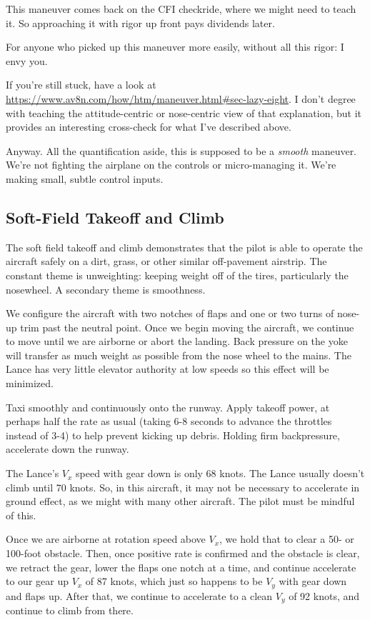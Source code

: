 This maneuver comes back on the CFI checkride, where we might need to teach it. So approaching it with rigor up front pays dividends later.

For anyone who picked up this maneuver more easily, without all this rigor: I envy you.

If you're still stuck, have a look at \url{https://www.av8n.com/how/htm/maneuver.html#sec-lazy-eight}. I don't degree with teaching the attitude-centric or nose-centric view of that explanation, but it provides an interesting cross-check for what I've described above.

Anyway. All the quantification aside, this is supposed to be a \emph{smooth} maneuver. We're not fighting the airplane on the controls or micro-managing it. We're making small, subtle control inputs.

\subsection{Soft-Field Takeoff and Climb}

The soft field takeoff and climb demonstrates that the pilot is able to operate the aircraft safely on a dirt, grass, or other similar off-pavement airstrip. The constant theme is unweighting: keeping weight off of the tires, particularly the nosewheel. A secondary theme is smoothness.

We configure the aircraft with two notches of flaps and one or two turns of nose-up trim past the neutral point. Once we begin moving the aircraft, we continue to move until we are airborne or abort the landing. Back pressure on the yoke will transfer as much weight as possible from the nose wheel to the mains. The Lance has very little elevator authority at low speeds so this effect will be minimized.

Taxi smoothly and continuously onto the runway. Apply takeoff power, at perhaps half the rate as usual (taking 6-8 seconds to advance the throttles instead of 3-4) to help prevent kicking up debris. Holding firm backpressure, accelerate down the runway.

The Lance's $V_x$ speed with gear down is only 68 knots. The Lance usually doesn't climb until 70 knots. So, in this aircraft, it may not be necessary to accelerate in ground effect, as we might with many other aircraft. The pilot must be mindful of this.

Once we are airborne at rotation speed above $V_x$, we hold that to clear a 50- or 100-foot obstacle. Then, once positive rate is confirmed and the obstacle is clear, we retract the gear, lower the flaps one notch at a time, and continue accelerate to our gear up $V_x$ of 87 knots, which just so happens to be $V_y$ with gear down and flaps up. After that, we continue to accelerate to a clean $V_y$ of 92 knots, and continue to climb from there.

